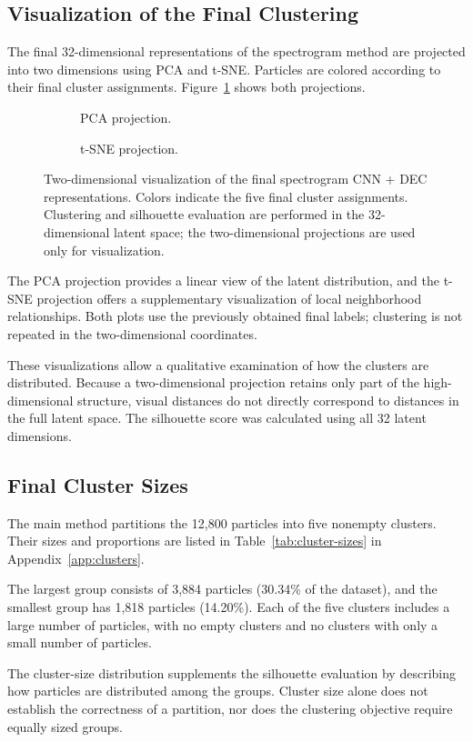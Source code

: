 \subsection{Visualization of the Final Clustering}

The final 32-dimensional representations of the spectrogram method are projected into two dimensions using PCA and t-SNE. Particles are colored according to their final cluster assignments. Figure~\ref{fig:latent-projections} shows both projections.

\begin{figure}[htbp]
\centering
\begin{subfigure}[t]{0.49\linewidth}
\centering
{}
\caption{PCA projection.}
\end{subfigure}\hfill
\begin{subfigure}[t]{0.49\linewidth}
\centering
{}
\caption{t-SNE projection.}
\end{subfigure}
\caption[Two-dimensional projections of the final latent representations]{Two-dimensional visualization of the final spectrogram CNN + DEC representations. Colors indicate the five final cluster assignments. Clustering and silhouette evaluation are performed in the 32-dimensional latent space; the two-dimensional projections are used only for visualization.}
\label{fig:latent-projections}
\end{figure}

The PCA projection provides a linear view of the latent distribution, and the t-SNE projection offers a supplementary visualization of local neighborhood relationships. Both plots use the previously obtained final labels; clustering is not repeated in the two-dimensional coordinates.

These visualizations allow a qualitative examination of how the clusters are distributed. Because a two-dimensional projection retains only part of the high-dimensional structure, visual distances do not directly correspond to distances in the full latent space. The silhouette score was calculated using all 32 latent dimensions.

\subsection{Final Cluster Sizes}

The main method partitions the 12,800 particles into five nonempty clusters. Their sizes and proportions are listed in Table~\ref{tab:cluster-sizes} in Appendix~\ref{app:clusters}.

The largest group consists of 3,884 particles (30.34\% of the dataset), and the smallest group has 1,818 particles (14.20\%). Each of the five clusters includes a large number of particles, with no empty clusters and no clusters with only a small number of particles.

The cluster-size distribution supplements the silhouette evaluation by describing how particles are distributed among the groups. Cluster size alone does not establish the correctness of a partition, nor does the clustering objective require equally sized groups.